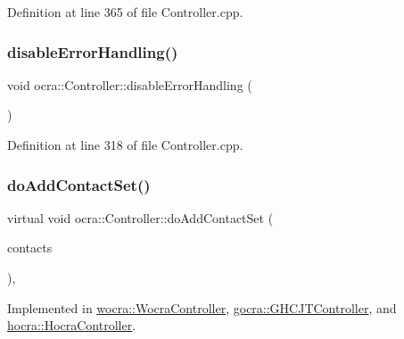 Definition at line 365 of file Controller.\+cpp.

\hypertarget{classocra_1_1Controller_aad44e0db3e0039bf3d6eeb3a89a99752}{}\label{classocra_1_1Controller_aad44e0db3e0039bf3d6eeb3a89a99752} 
\subsubsection{\texorpdfstring{disable\+Error\+Handling()}{disableErrorHandling()}}
{\footnotesize\ttfamily void ocra\+::\+Controller\+::disable\+Error\+Handling (\begin{DoxyParamCaption}{ }\end{DoxyParamCaption})}



Definition at line 318 of file Controller.\+cpp.

\hypertarget{classocra_1_1Controller_acb11edc1ceaa89423c1e58f9cb38a9f7}{}\label{classocra_1_1Controller_acb11edc1ceaa89423c1e58f9cb38a9f7} 
\subsubsection{\texorpdfstring{do\+Add\+Contact\+Set()}{doAddContactSet()}}
{\footnotesize\ttfamily virtual void ocra\+::\+Controller\+::do\+Add\+Contact\+Set (\begin{DoxyParamCaption}\item[{const \hyperlink{classocra_1_1ContactSet}{Contact\+Set} \&}]{contacts }\end{DoxyParamCaption})\hspace{0.3cm}{\ttfamily [protected]}, {}}



Implemented in \hyperlink{classwocra_1_1WocraController_a74d8fa3103ca3787add351620c5bcf73}{wocra\+::\+Wocra\+Controller}, \hyperlink{classgocra_1_1GHCJTController_a28367b3b895eaa223581131258ef5d2d}{gocra\+::\+G\+H\+C\+J\+T\+Controller}, and \hyperlink{classhocra_1_1HocraController_a6292f35dbfe7f2292f018c51d492ace2}{hocra\+::\+Hocra\+Controller}.

\hypertarget{classocra_1_1Controller_ab3477822a9363553c99eefa58ff803eb}{}\label{classocra_1_1Controller_ab3477822a9363553c99eefa58ff803eb} 
